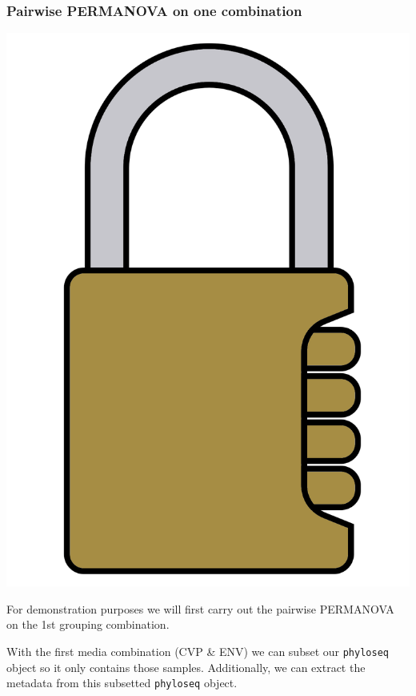 \documentclass[
]{book}
\begin{document}
\hypertarget{pairwise-permanova-on-one-combination}{%
\subsubsection{Pairwise PERMANOVA on one combination}\label{pairwise-permanova-on-one-combination}}

\includegraphics{figures/combination_lock.png}

For demonstration purposes we will first carry out the pairwise PERMANOVA on the 1st grouping combination.

With the first media combination (CVP \& ENV) we can subset our \texttt{phyloseq} object so it only contains those samples.
Additionally, we can extract the metadata from this subsetted \texttt{phyloseq} object.
\end{document}
